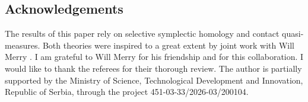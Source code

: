 \documentclass[pdftex]{sigma}
\numberwithin{equation}{section}
\theoremstyle{definition}
\begin{document}
\subsection*{Acknowledgements}

The results of this paper rely on selective symplectic homology and contact quasi-measures. Both theories were inspired to a great extent by joint work with Will Merry \cite{merry2019maximum}. I am grateful to Will Merry for his friendship and for this collaboration. I would like to thank the referees for their thorough review. The author is partially supported by the Ministry of Science, Technological Development and Innovation, Republic of Serbia, through the project 451-03-33/2026-03/200104.


%
%
\end{document}
